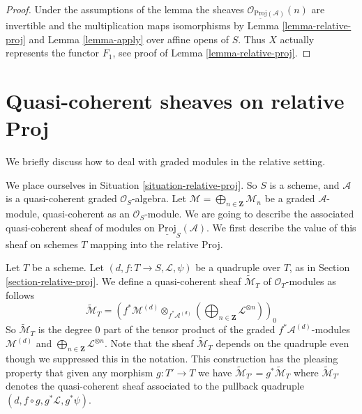 \begin{proof}
Under the assumptions of the lemma the sheaves
$\mathcal{O}_{\underline{\text{Proj}}(\mathcal{A})}(n)$
are invertible and the multiplication maps isomorphisms
by Lemma \ref{lemma-relative-proj} and
Lemma \ref{lemma-apply}
over affine opens of $S$. Thus $X$ actually represents the
functor $F_1$, see proof of Lemma \ref{lemma-relative-proj}.
\end{proof}












\section{Quasi-coherent sheaves on relative Proj}
\label{section-quasi-coherent-relative-proj}

\noindent
We briefly discuss how to deal with graded modules in the relative
setting.

\medskip\noindent
We place ourselves in Situation \ref{situation-relative-proj}.
So $S$ is a scheme, and
$\mathcal{A}$ is a quasi-coherent graded $\mathcal{O}_S$-algebra.
Let $\mathcal{M} = \bigoplus_{n \in \mathbf{Z}} \mathcal{M}_n$
be a graded $\mathcal{A}$-module, quasi-coherent as an $\mathcal{O}_S$-module.
We are going to describe the associated quasi-coherent sheaf
of modules on $\underline{\text{Proj}}_S(\mathcal{A})$.
We first describe the value of this sheaf on schemes $T$ mapping
into the relative Proj.

\medskip\noindent
Let $T$ be a scheme. Let $(d, f : T \to S, \mathcal{L}, \psi)$
be a quadruple over $T$, as in Section \ref{section-relative-proj}.
We define a quasi-coherent sheaf
$\widetilde{\mathcal{M}}_T$ of $\mathcal{O}_T$-modules
as follows
\begin{equation}
\label{equation-widetilde-M}
\widetilde{\mathcal{M}}_T =
\left(
f^*\mathcal{M}^{(d)}
\otimes_{f^*\mathcal{A}^{(d)}}
\left(\bigoplus\nolimits_{n \in \mathbf{Z}} \mathcal{L}^{\otimes n}\right)
\right)_0
\end{equation}
So $\widetilde{\mathcal{M}}_T$ is the degree $0$ part
of the tensor product of the graded $f^*\mathcal{A}^{(d)}$-modules
$\mathcal{M}^{(d)}$ and
$\bigoplus\nolimits_{n \in \mathbf{Z}} \mathcal{L}^{\otimes n}$.
Note that the sheaf $\widetilde{\mathcal{M}}_T$ depends on the quadruple
even though we suppressed this in the notation.
This construction has the pleasing property that
given any morphism $g : T' \to T$ we have
$\widetilde{\mathcal{M}}_{T'} = g^*\widetilde{\mathcal{M}}_T$
where $\widetilde{\mathcal{M}}_{T'}$ denotes the quasi-coherent
sheaf associated to the pullback quadruple
$(d, f \circ g, g^*\mathcal{L}, g^*\psi)$.

